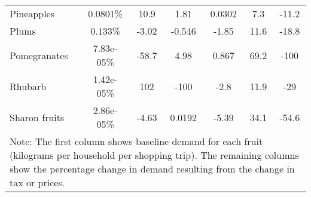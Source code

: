 \documentclass[11pt]{article}
\begin{document}
\begin{table}[h]
\begin{center}
\begin{tabular}{lcccccc}
Pineapples &0.0801\% &10.9 &1.81 &0.0302 &7.3 &-11.2 \\
Plums &0.133\% &-3.02 &-0.546 &-1.85 &11.6 &-18.8 \\
Pomegranates &7.83e-05\% &-58.7 &4.98 &0.867 &69.2 &-100 \\
\hline
Rhubarb &1.42e-05\% &102 &-100 &-2.8 &11.9 &-29 \\
Sharon fruits &2.86e-05\% &-4.63 &0.0192 &-5.39 &34.1 &-54.6 \\
 \hline \hline
\multicolumn{7}{p{0.8 \textwidth}}{Note: The first column shows baseline demand for each fruit (kilograms per household per shopping trip). The remaining columns show the percentage change in demand resulting from the change in tax or prices.}
\end{tabular}
\end{center}
\end{table}
\end{document}
